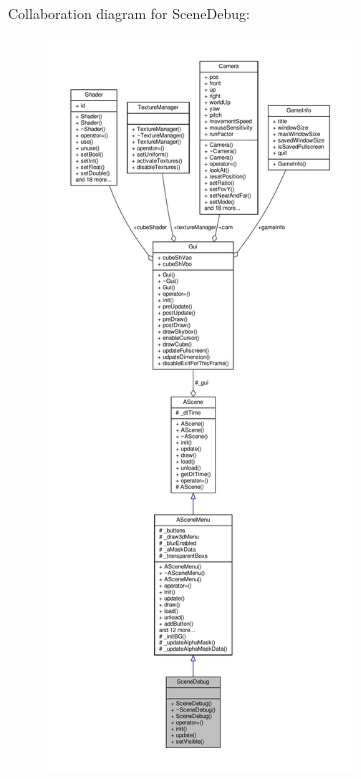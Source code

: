 Collaboration diagram for Scene\+Debug\+:
\nopagebreak
\begin{figure}[H]
\begin{center}
\leavevmode
\includegraphics[height=550pt]{class_scene_debug__coll__graph}
\end{center}
\end{figure}
